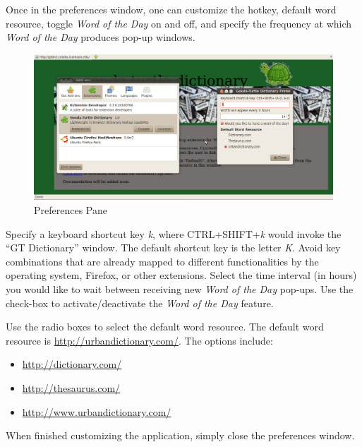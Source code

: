 \documentclass[11pt]{article}
\begin{document}
Once in the preferences window, one can customize the hotkey, default word
resource, toggle \textit{Word of the Day} on and off, and specify the
frequency at which \textit{Word of the Day} produces pop-up windows.

\begin{figure}[ht!]
\centering
\includegraphics[scale=0.3]{gt1.png}
\caption{Preferences Pane}
\label{gtfoo}
\end{figure}

\FloatBarrier
Specify a keyboard shortcut key \textit{k},
where CTRL+SHIFT+\textit{k} would invoke the ``GT Dictionary'' window.
The default shortcut key is the letter  \emph{K}.
Avoid key combinations that are already mapped to different functionalities by
the operating system, Firefox, or other extensions.
Select the time interval (in hours) you would like to wait between receiving
new \textit{Word of the Day} pop-ups. Use the check-box to activate/deactivate
the \textit{Word of the Day} feature.

Use the radio boxes to select the default word resource.
The default word resource is \url{http://urbandictionary.com/}.
The options include:
\begin{itemize}
\item{\url{http://dictionary.com/}}
\item{\url{http://thesaurus.com/}}
\item{\url{http://www.urbandictionary.com/}}
\end{itemize}


When finished customizing the application, simply close the preferences window.
\end{document}
